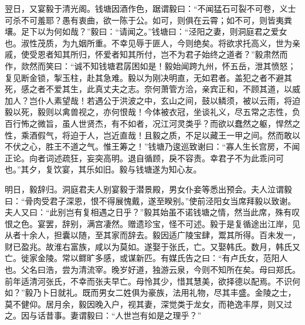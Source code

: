 \documentclass[UTF8,titlepage,oneside]{ctexbook}
\begin{document}
翌日，又宴毅于清光阁。钱塘因酒作色，踞谓毅曰：“不闻猛石可裂不可卷，义士可杀不可羞耶？愚有衷曲，欲一陈于公。如可，则俱在云霄；如不可，则皆夷粪壤。足下以为何如哉？”毅曰：“请闻之。”钱塘曰：“泾阳之妻，则洞庭君之爱女也。淑性茂质，为九姻所重。不幸见辱于匪人，今则绝矣。将欲求托高义，世为亲戚，使受恩者知其所归，怀爱者知其所付，岂不为君子始终之道者？”毅肃然而作，欻然而笑曰：“诚不知钱塘君孱困如是！毅始闻跨九州，怀五岳，泄其愤怒；复见断金锁，掣玉柱，赴其急难。毅以为刚决明直，无如君者。盖犯之者不避其死，感之者不爱其生，此真丈夫之志。奈何萧管方洽，亲宾正和，不顾其道，以威加人？岂仆人素望哉！若遇公于洪波之中，玄山之间，鼓以鳞须，被以云雨，将迫毅以死，毅则以禽兽视之，亦何恨哉！今体被衣冠，坐谈礼义，尽五常之志性，负百行怖之微旨，虽人世贤杰，有不如者，况江河灵类乎？而欲以蠢然之躯，悍然之性，乘酒假气，将迫于人，岂近直哉！且毅之质，不足以藏王一甲之间。然而敢以不伏之心，胜王不道之气。惟王筹之！”钱塘乃逡巡致谢曰：“寡人生长宫房，不闻正论。向者词述疏狂，妄突高明。退自循顾，戾不容责。幸君子不为此乖问可也。”其夕，复饮宴，其乐如旧。毅与钱塘遂为知心友。

明日，毅辞归。洞庭君夫人别宴毅于潜景殿，男女仆妾等悉出预会。夫人泣谓毅曰：“骨肉受君子深恩，恨不得展愧戴，遂至睽别。”使前泾阳女当席拜毅以致谢。夫人又曰：“此别岂有复相遇之日乎？”毅其始虽不诺钱塘之情，然当此席，殊有叹恨之色。宴罢，辞别，满宫凄然。赠遗珍宝，怪不可述。毅于是复循途出江岸，见从者十余人，担囊以随，至其家而辞去。毅因适广陵宝肆，鬻其所得。百未发一，财已盈兆。故淮右富族，咸以为莫如。遂娶于张氏，亡。又娶韩氏。数月，韩氏又亡。徙家金陵。常以鳏旷多感，或谋新匹。有媒氏告之曰：“有卢氏女，范阳人也。父名曰浩，尝为清流宰。晚岁好道，独游云泉，今则不知所在矣。母曰郑氏。前年适清河张氏，不幸而张夫早亡。母怜其少，惜其慧美，欲择德以配焉。不识何如？”毅乃卜日就礼。既而男女二姓俱为豪族，法用礼物，尽其丰盛。金陵之士，莫不健仰。居月余，毅因晚入户，视其妻，深觉类于龙女，而艳逸丰厚，则又过之。因与话昔事。妻谓毅曰：“人世岂有如是之理乎？”
\end{document}
